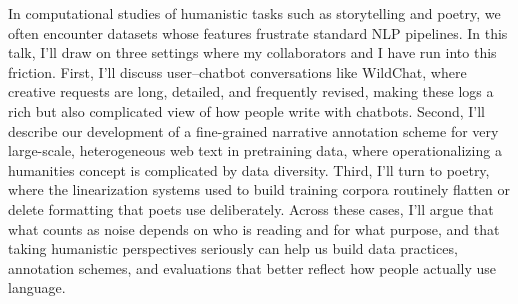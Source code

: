 In computational studies of humanistic tasks such as storytelling and poetry, we often encounter datasets whose features frustrate standard NLP pipelines. In this talk, I'll draw on three settings where my collaborators and I have run into this friction. First, I'll discuss user–chatbot conversations like WildChat, where creative requests are long, detailed, and frequently revised, making these logs a rich but also complicated view of how people write with chatbots. Second, I'll describe our development of a fine-grained narrative annotation scheme for very large-scale, heterogeneous web text in pretraining data, where operationalizing a humanities concept is complicated by data diversity. Third, I'll turn to poetry, where the linearization systems used to build training corpora routinely flatten or delete formatting that poets use deliberately. Across these cases, I'll argue that what counts as noise depends on who is reading and for what purpose, and that taking humanistic perspectives seriously can help us build data practices, annotation schemes, and evaluations that better reflect how people actually use language.